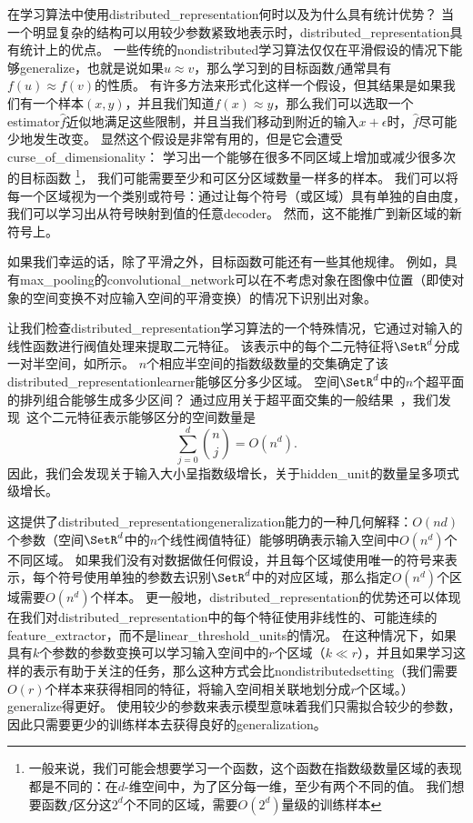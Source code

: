 
在学习算法中使用\gls{distributed_representation}何时以及为什么具有统计优势？
当一个明显复杂的结构可以用较少参数紧致地表示时，\gls{distributed_representation}具有统计上的优点。
一些传统的\gls{nondistributed}学习算法仅仅在平滑假设的情况下能够\gls{generalize}，也就是说如果$u\approx v$，那么学习到的目标函数$f$通常具有$f(u) \approx f(v)$的性质。
有许多方法来形式化这样一个假设，但其结果是如果我们有一个样本$(x,y)$，并且我们知道$f(x) \approx y$，那么我们可以选取一个\gls{estimator}$\hat{f}$近似地满足这些限制，并且当我们移动到附近的输入$x + \epsilon$时，$\hat{f}$尽可能少地发生改变。
显然这个假设是非常有用的，但是它会遭受\gls{curse_of_dimensionality}：
学习出一个能够在很多不同区域上增加或减少很多次的目标函数
\footnote{一般来说，我们可能会想要学习一个函数，这个函数在指数级数量区域的表现都是不同的：在$d$-维空间中，为了区分每一维，至少有两个不同的值。
我们想要函数$f$区分这$2^d$个不同的区域，需要$O(2^d)$量级的训练样本}，
我们可能需要至少和可区分区域数量一样多的样本。
我们可以将每一个区域视为一个类别或符号：通过让每个符号（或区域）具有单独的自由度，我们可以学习出从符号映射到值的任意\gls{decoder}。
然而，这不能推广到新区域的新符号上。


如果我们幸运的话，除了平滑之外，目标函数可能还有一些其他规律。
例如，具有\gls{max_pooling}的\gls{convolutional_network}可以在不考虑对象在图像中位置（即使对象的空间变换不对应输入空间的平滑变换）的情况下识别出对象。


让我们检查\gls{distributed_representation}学习算法的一个特殊情况，它通过对输入的线性函数进行阀值处理来提取二元特征。
该表示中的每个二元特征将$\SetR^d$分成一对半空间，如所示。
$n$个相应半空间的指数级数量的交集确定了该\gls{distributed_representation}\gls{learner}能够区分多少区域。
空间$\SetR^d$中的$n$个超平面的排列组合能够生成多少区间？
通过应用关于超平面交集的一般结果~\citep{Zaslavsky-1975}，我们发现~\citep{Pascanu+et+al-ICLR2014b}这个二元特征表示能够区分的空间数量是
\begin{equation}
	\sum_{j=0}^d \binom{n}{j} = O(n^d).
\end{equation}
因此，我们会发现关于输入大小呈指数级增长，关于\gls{hidden_unit}的数量呈多项式级增长。


这提供了\gls{distributed_representation}\gls{generalization}能力的一种几何解释：$O(nd)$个参数（空间$\SetR^d$中的$n$个线性阀值特征）能够明确表示输入空间中$O(n^d)$个不同区域。
如果我们没有对数据做任何假设，并且每个区域使用唯一的符号来表示，每个符号使用单独的参数去识别$\SetR^d$中的对应区域，那么指定$O(n^d)$个区域需要$O(n^d)$个样本。
更一般地，\gls{distributed_representation}的优势还可以体现在我们对\gls{distributed_representation}中的每个特征使用非线性的、可能连续的\gls{feature_extractor}，而不是\gls{linear_threshold_units}的情况。
在这种情况下，如果具有$k$个参数的参数变换可以学习输入空间中的$r$个区域（$k\ll r$），并且如果学习这样的表示有助于关注的任务，那么这种方式会比\gls{nondistributed}\gls{setting}（我们需要$O(r)$个样本来获得相同的特征，将输入空间相关联地划分成$r$个区域。）\gls{generalize}得更好。
使用较少的参数来表示模型意味着我们只需拟合较少的参数，因此只需要更少的训练样本去获得良好的\gls{generalization}。

